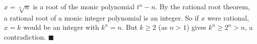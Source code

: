 $x=\sqrt[n]n$ is a root of the monic polynomial $t^n-n$. By the rational root theorem, a rational root of a monic integer polynomial is an integer. So if $x$ were rational, $x=k$ would be an integer with $k^n=n$. But $k\ge2$ (as $n>1$) gives $k^n\ge2^n>n$, a contradiction. $\blacksquare$
